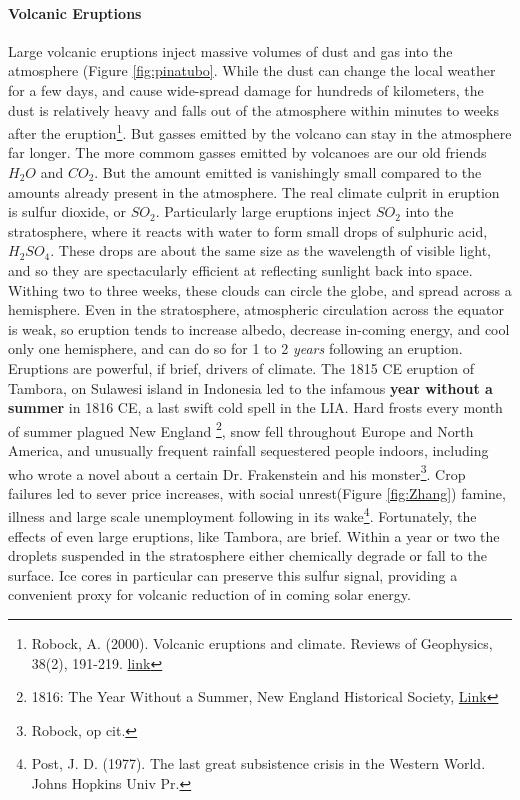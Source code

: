 \paragraph{Volcanic Eruptions}
Large volcanic eruptions inject massive volumes of dust and gas into the atmosphere (Figure \ref{fig:pinatubo}. While the dust can change the local weather for a few days, and cause wide-spread damage for hundreds of kilometers, the dust is relatively heavy and falls out of the atmosphere within minutes to weeks after the eruption\footnote{Robock, A. (2000). Volcanic eruptions and climate. Reviews of Geophysics, 38(2), 191-219. \href{https://doi.org/10.1029/1998RG000054}{link}}. But gasses emitted by the volcano can stay in the atmosphere far longer. The more commom gasses emitted by volcanoes are our old friends $H_2O$ and $CO_2$. But the amount emitted is vanishingly small compared to the amounts already present in the atmosphere. The real climate culprit in eruption is sulfur dioxide, or $SO_2$. Particularly large eruptions inject $SO_2$ into the stratosphere, where it reacts with water to form small drops of sulphuric acid, $H_2SO_4$. These drops are about the same size as the wavelength of visible light, and so they are spectacularly efficient at reflecting sunlight back into space. Withing two to three weeks, these clouds can circle the globe, and spread across a hemisphere. Even in the stratosphere, atmospheric circulation across the equator is weak, so eruption tends to increase albedo, decrease in-coming energy, and cool only one hemisphere, and can do so for 1 to 2 \textit{years} following an eruption. Eruptions are powerful, if brief, drivers of climate. The 1815 CE eruption of Tambora, on Sulawesi island in Indonesia led to the infamous \textbf{year without a summer} in 1816 CE, a last swift cold spell in the LIA. Hard frosts every month of summer plagued New England \footnote{1816: The Year Without a Summer, New England Historical Society, \href{http://www.newenglandhistoricalsociety.com/1816-year-without-a-summer/}{Link}}, snow fell throughout Europe and North America, and unusually frequent rainfall sequestered people indoors, including who wrote a novel about a certain Dr. Frakenstein and his monster\footnote{Robock, op cit.}. Crop failures led to sever price increases, with social unrest(Figure \ref{fig:Zhang}) famine, illness and large scale unemployment following in its wake\footnote{Post, J. D. (1977). The last great subsistence crisis in the Western World. Johns Hopkins Univ Pr.}. Fortunately, the effects of even large eruptions, like Tambora, are brief. Within a year or two the droplets suspended in the stratosphere either chemically degrade or fall to the surface. Ice cores in particular can preserve this sulfur signal, providing a convenient proxy for volcanic reduction of in coming solar energy.\\

